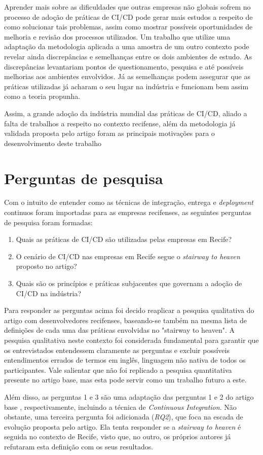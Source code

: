 Aprender mais sobre as dificuldades que outras empresas não globais sofrem no processo de adoção de práticas de CI/CD pode gerar mais estudos a respeito de como solucionar tais problemas, assim como mostrar possíveis oportunidades de melhoria e revisão dos processos utilizados. Um trabalho que utilize uma adaptação da metodologia aplicada a uma amostra de um outro contexto pode revelar ainda discrepâncias e semelhanças entre os dois ambientes de estudo. As discrepâncias levantariam pontos de questionamento, pesquisa e até possíveis melhorias aos ambientes envolvidos. Já as semelhanças podem assegurar que as práticas utilizadas já acharam o seu lugar na indústria e funcionam bem assim como a teoria propunha.

Assim, a grande adoção da indústria mundial das práticas de CI/CD, aliado a falta de trabalhos a respeito no contexto recifense, além da metodologia já validada proposta pelo artigo foram as principais motivações para o desenvolvimento deste trabalho

\section{Perguntas de pesquisa} 
Com o intuito de entender como as técnicas de integração, entrega e \emph{deployment} continuos foram importadas para as empresas recifenses, as seguintes perguntas de pesquisa foram formadas:

\begin{enumerate}
\item Quais as práticas de CI/CD são utilizadas pelas empresas em Recife?
\item O cenário de CI/CD nas empresas em Recife segue o \emph{stairway to heaven} proposto no artigo?
\item Quais são os princípios e práticas subjacentes que governam a adoção de CI/CD na indústria?
\end{enumerate}

Para responder as perguntas acima foi decido reaplicar a pesquisa qualitativa do artigo \cite{empiricalStudy2016} com desenvolvedores recifenses, baseando-se também na mesma lista de definições de cada uma das práticas envolvidas no "stairway to heaven". A pesquisa qualitativa neste contexto foi considerada fundamental para garantir que os entrevistados entendessem claramente as perguntas e excluir possíveis entendimentos errados de termos em inglês, linguagem não nativa de todos os participantes. Vale salientar que não foi replicado a pesquisa quantitativa presente no artigo base, mas esta pode servir como um trabalho futuro a este.

Além disso, as perguntas 1 e 3 são uma adaptação das perguntas 1 e 2 do artigo base \cite{empiricalStudy2016}, respectivamente, incluindo a técnica de \emph{Continuous Integration}. Não obstante, uma terceira pergunta foi adicionada (\emph{RQ2}), que foca na escada de evolução proposta pelo artigo. Ela tenta responder se a \emph{stairway to heaven} é seguida no contexto de Recife, visto que, no outro, os próprios autores já refutaram esta definição com os seus resultados.


